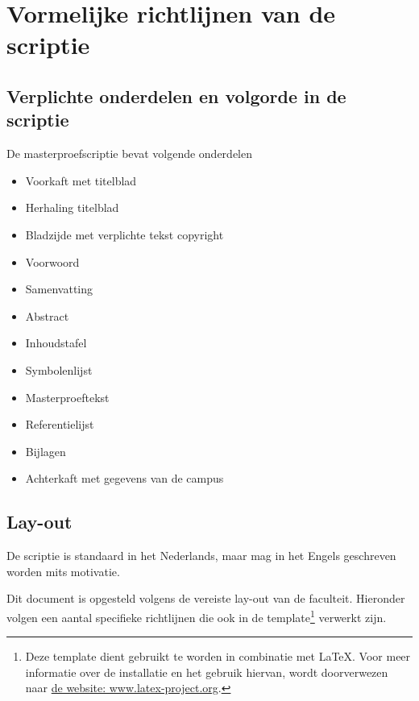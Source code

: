 
\chapter{Vormelijke richtlijnen van de scriptie}

\section{Verplichte onderdelen en volgorde in de scriptie}

De masterproefscriptie bevat volgende onderdelen

\begin{itemize}
\item	Voorkaft met titelblad
\item Herhaling titelblad
\item	Bladzijde met verplichte tekst copyright
\item	Voorwoord
\item	Samenvatting
\item	Abstract
\item	Inhoudstafel
\item	Symbolenlijst
\item	Masterproeftekst
\item	Referentielijst
\item	Bijlagen
\item	Achterkaft met gegevens van de campus
\end{itemize}

\section{Lay-out}
De scriptie is standaard in het Nederlands, maar mag in het Engels geschreven worden mits motivatie. 

Dit document is opgesteld volgens de vereiste lay-out van de faculteit. Hieronder volgen een aantal specifieke richtlijnen die ook in de template\footnote{Deze template dient gebruikt te worden in combinatie met LaTeX. Voor meer informatie over de installatie en het gebruik hiervan, wordt doorverwezen naar \href{https://www.latex-project.org}{de website: www.latex-project.org}.} verwerkt zijn.

